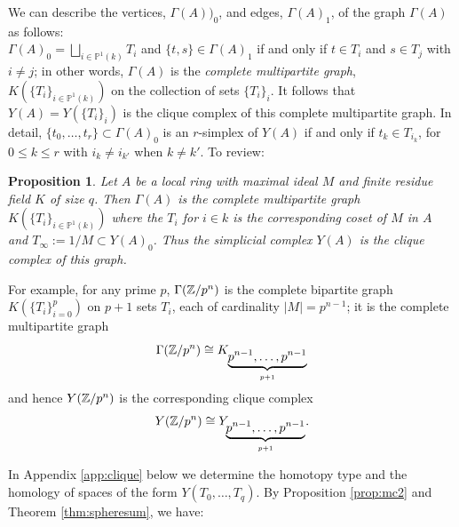 \documentclass[12pt]{amsart}
\newtheorem{prop}[lem]{Proposition}
\theoremstyle{definition}
\newtheorem{rem}[lem]{Remark}
\newcommand{\Z}{\Bbb{Z}}
\newcommand{\pn}[2]{\mathbb{P}^{#1}(#2)}
\newcommand{\projl}[1]{\pn{1}{#1}}
\newcommand{\<}{\langle}
\renewcommand{\>}{\rangle}
\begin{document}
We can describe the
 vertices, $\Gamma(A))_0$, and edges, $\Gamma(A)_1$, of the graph $\Gamma(A)$ as follows:\\
 $\Gamma(A)_0=\bigsqcup_{i\in\projl{k}}T_i$ and 
$\{ t,s\}\in \Gamma(A)_1$ if and only if $t\in T_{i}$ and $s\in T_{j}$ with $i\not=j$; in other words, $\Gamma(A)$ is the \emph{complete multipartite 
graph}, $K(\{ T_i\}_{i\in\projl{k}})$  on the collection of sets $\{ T_i\}_{i}$. It follows that $Y(A)=Y(\{ T_i\}_{i})$ is the clique complex of this complete multipartite 
graph. In detail, $\{ t_0,\ldots,t_r\}\subset \Gamma(A)_0$ is an $r$-simplex of $Y(A)$ if and only if $t_k\in T_{i_k}$, for $0\leq k\leq r$ with $i_k\not=i_{k'}$ when $k\not=k'$. 
To review:

\begin{prop}\label{prop:localya} Let $A$ be a local ring with maximal ideal $M$ and finite residue field $K$ of size $q$. Then $\Gamma(A)$ is the complete multipartite graph 
$K(\{ T_i\}_{i\in\projl{k}})$ where the $T_i$
for $i\in k$ is the corresponding  coset of $M$  in $A$ and $T_\infty:= 1/M\subset Y(A)_0$. Thus the simplicial complex $Y(A)$ is the clique complex of this graph.
\end{prop}


For example, for any prime $p$, $\Gamma(\Z/p^n)$ is the complete bipartite graph $K(\{T_i\}_{i=0}^p)$ on $p+1$ sets $T_i$, each of cardinality $|M|=p^{n-1}$; it is the complete 
multipartite graph 
\[
\Gamma(\Z/p^n)\cong K_{\underbrace{p^{n-1},\ldots,p^{n-1}}_{p+1}}
\]
and hence $Y(\Z/p^n)$ is the corresponding clique complex
\[
Y(\Z/p^n)\cong Y_{\underbrace{p^{n-1},\ldots,p^{n-1}}_{p+1}}.
\]

In Appendix \ref{app:clique} below we determine the homotopy type and the homology of spaces of the form $Y(T_0,\ldots,T_q)$.    By Proposition \ref{prop:mc2} and Theorem \ref{thm:spheresum}, we have:
\end{document}

